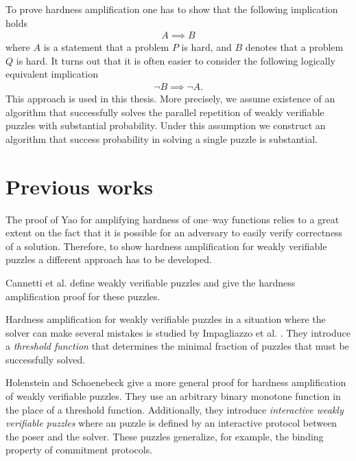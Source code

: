 To prove hardness amplification one has to show that the following implication holds
\begin{align*}
  A \implies B
\end{align*}
where $A$ is a statement that a problem $P$ is hard, and $B$ denotes that a problem $Q$ is hard.
It turns out that it is often easier to consider the following logically equivalent implication
\begin{align*}
  \lnot B \implies \lnot A.
\end{align*}
This approach is used in this thesis. More precisely, we assume existence of an algorithm that successfully
solves the parallel repetition of weakly verifiable puzzles with substantial probability.
Under this assumption we construct an algorithm that success probability in solving a single puzzle is substantial.

\section{Previous works}

The proof of Yao for amplifying hardness of one--way functions relies to a great extent on the fact that it is possible
for an adversary to easily verify correctness of a solution. Therefore, to show hardness amplification
for weakly verifiable puzzles a different approach has to be developed.

Cannetti et al. \cite{canetti2005hardness} define weakly verifiable puzzles and give the hardness amplification proof for these puzzles.

Hardness amplification for weakly verifiable puzzles in a situation where the solver can make several mistakes is studied by Impagliazzo et al. \cite{impagliazzo2007chernoff}.
They introduce a \textit{threshold function} that determines the minimal fraction of puzzles that must be successfully solved.

Holenstein and Schoenebeck \cite{holenstein2011general} give a more general proof for hardness amplification
of weakly verifiable puzzles. They use an arbitrary binary monotone function in the place of a threshold function.
Additionally, they introduce \textit{interactive weakly verifiable puzzles} where an puzzle is defined by
an interactive protocol between the poser and the solver. These puzzles generalize, for example, the binding property of commitment protocols.

